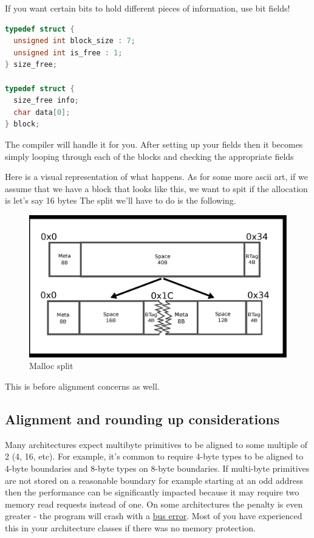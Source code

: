 If you want certain bits to hold different pieces of information, use bit fields!

\begin{lstlisting}[language=C]
typedef struct {
  unsigned int block_size : 7;
  unsigned int is_free : 1;
} size_free;

typedef struct {
  size_free info;
  char data[0];
} block;
\end{lstlisting}

The compiler will handle it for you.
After setting up your fields then it becomes simply looping through each of the blocks and checking the appropriate fields

Here is a visual representation of what happens.
As for some more ascii art, if we assume that we have a block that looks like this, we want to spit if the allocation is let's say 16 bytes
The split we'll have to do is the following.

\begin{figure}[H]
\centering
\includegraphics[width=.7\textwidth]{malloc/drawings/malloc_split.eps}
\caption{Malloc split}
\end{figure}

This is before alignment concerns as well.

\subsection{Alignment and rounding up considerations}

Many architectures expect multibyte primitives to be aligned to some multiple of 2 (4, 16, etc).
For example, it's common to require 4-byte types to be aligned to 4-byte boundaries and 8-byte types on 8-byte boundaries.
If multi-byte primitives are not stored on a reasonable boundary for example starting at an odd address then the performance can be significantly impacted because it may require two memory read requests instead of one.
On some architectures the penalty is even greater - the program will crash with a \href{http://en.wikipedia.org/wiki/Bus_error\#Unaligned_access}{bus error}.
Most of you have experienced this in your architecture classes if there was no memory protection.

